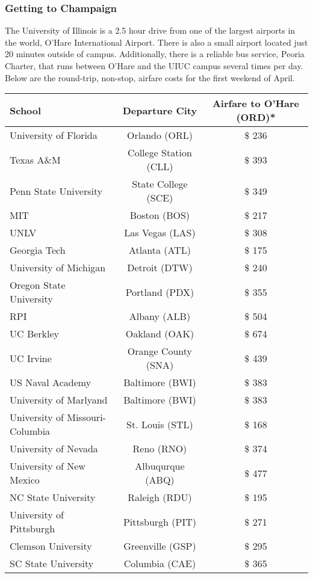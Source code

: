 \subsubsection{Getting to Champaign}
The University of Illinois is a 2.5 hour drive from one of the largest airports in the world, O'Hare International Airport. There is also a small airport located just 20 minutes outside of campus. Additionally, there is a reliable bus service, Peoria Charter, that runs between O'Hare and the UIUC campus several times per day. Below are the round-trip, non-stop, airfare costs for the first weekend of April.  
\begin{center}
	\begin{tabular}{lcc}
		\hline\hline
		\textbf{School} & \textbf{Departure City} & \textbf{Airfare to O'Hare (ORD)*}\\
		\hline\hline
		University of Florida & Orlando (ORL) & $\$$ 236\\
		Texas A$\&$M & College Station (CLL)& $\$$ 393\\
		Penn State University & State College (SCE) & $\$$ 349\\
		MIT & Boston (BOS) & $\$$ 217\\
		UNLV & Las Vegas (LAS) & $\$$ 308\\
		Georgia Tech & Atlanta (ATL) & $\$$ 175\\
		University of Michigan & Detroit (DTW) & $\$$ 240\\
		Oregon State University & Portland (PDX) & $\$$ 355\\
		RPI & Albany (ALB) & $\$$ 504\\
		UC Berkley & Oakland (OAK) & $\$$ 674\\
		UC Irvine & Orange County (SNA) & $\$$ 439\\
		US Naval Academy & Baltimore (BWI)& $\$$ 383\\
		University of Marlyand & Baltimore (BWI) & $\$$ 383\\
		University of Missouri-Columbia & St. Louis (STL) & $\$$ 168\\
		University of Nevada & Reno (RNO) & $\$$ 374\\
		University of New Mexico & Albuqurque (ABQ) & $\$$ 477\\
		NC State  University & Raleigh (RDU) & $\$$ 195\\
		University of Pittsburgh& Pittsburgh (PIT) & $\$$ 271\\
		Clemson University & Greenville (GSP) & $\$$ 295\\
		SC State University & Columbia (CAE) & $\$$ 365\\

\end{tabular}
\end{center}
